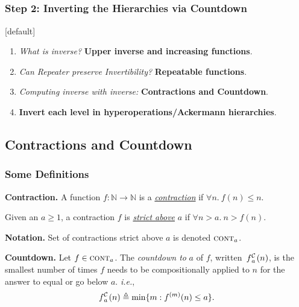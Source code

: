 \subsection*{}
\begin{frame}
\frametitle{Step 2: Inverting the Hierarchies via \textbf{Countdown}}
[default]

\begin{enumerate}[\bfseries 1.]
	\itemsep 3ex
	\item<done@1->
	\emph{What is inverse?} \textbf{Upper inverse and increasing functions}.
	
	\item<done@1->
	\emph{Can Repeater preserve Invertibility?} \textbf{Repeatable functions}.
	
	\item<come@2->
	\emph{Computing inverse with inverse:} \textbf{Contractions and Countdown}.
	
	\item
	\textbf{Invert each level in hyperoperations/Ackermann hierarchies}.
\end{enumerate}
\end{frame}


\subsection{Contractions and Countdown}


\begin{frame}
\frametitle{Some Definitions}

\pause 
\textbf{Contraction.} A function $f : \mathbb{N} \to \mathbb{N}$ is a
\href{https://github.com/inv-ack/inv-ack/blob/7270e64a2600b771f2b1b1b151f7d13fb2ae6c97/countdown.v\#L40-L42}{\emph{contraction}} if $\forall n.~ f(n) \le n$.

Given an $a \ge 1$, a contraction $f$ is
\href{https://github.com/inv-ack/inv-ack/blob/7270e64a2600b771f2b1b1b151f7d13fb2ae6c97/countdown.v\#L44-L46}{\emph{strict above}} $a$ if $\forall n > a.~n > f(n)$.

\bigskip

\textbf{Notation.} Set of contractions strict above $a$ is denoted $\text{\scshape{cont}}_a$.

\bigskip

\pause 
\textbf{Countdown.} Let $f\in \text{\scshape{cont}}_a$. The \textit{countdown to} $a$ of $f$, written~$\cdt{f}{a}(n)$, is the smallest number of times $f$ needs to be compositionally applied to
$n$ for the answer to equal or go below $a$. \emph{i.e.},
\begin{equation*}
\cdt{f}{a}(n) \triangleq \min\{m: f^{(m)}(n)\le a \}.
\end{equation*}
\end{frame}


